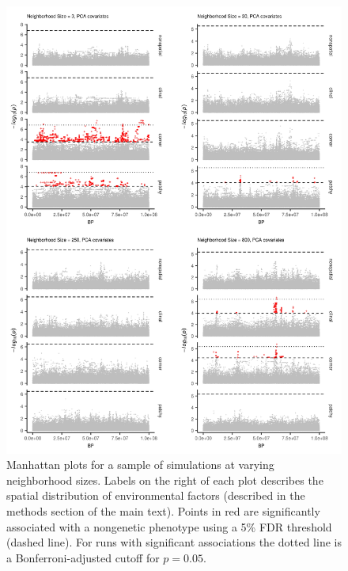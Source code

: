 \documentclass[10pt,twoside,lineno,hidelinks]{preprint}
\begin{document}
\afterpage{\clearpage}
\begin{figure}[p]
\centering
\includegraphics[height=0.9\textheight]{figures/manhattan_plots_combo-01.png}
\caption{Manhattan plots for a sample of simulations at varying neighborhood sizes. Labels on the right of each plot describes the spatial distribution of environmental factors (described in the methods section of the main text). Points in red are significantly associated with a nongenetic phenotype using a 5\% FDR threshold (dashed line). For runs with significant associations the dotted line is a Bonferroni-adjusted cutoff for $p=0.05$.}
\label{fig:manhattan_plots}
\end{figure}
\end{document}
